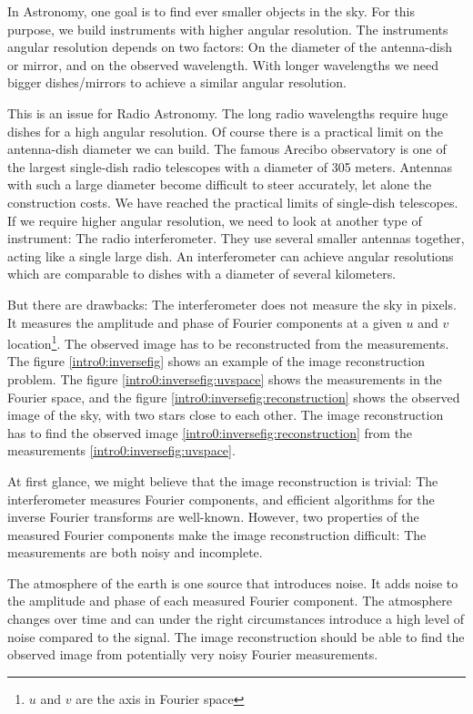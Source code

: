 In Astronomy, one goal is to find ever smaller objects in the sky. For this purpose, we build instruments with higher angular resolution. The instruments angular resolution depends on two factors: On the diameter of the antenna-dish or mirror, and on the observed wavelength. With longer wavelengths we need bigger dishes/mirrors to achieve a similar angular resolution. 

This is an issue for Radio Astronomy. The long radio wavelengths require huge dishes for a high angular resolution. Of course there is a practical limit on the antenna-dish diameter we can build. The famous Arecibo observatory is one of the largest single-dish radio telescopes with a diameter of 305 meters. Antennas with such a large diameter become difficult to steer accurately, let alone the construction costs. We have reached the practical limits of single-dish telescopes. If we require higher angular resolution, we need to look at another type of instrument: The radio interferometer. They use several smaller antennas together, acting like a single large dish. An interferometer can achieve angular resolutions which are comparable to dishes with a diameter of several kilometers.

But there are drawbacks: The interferometer does not measure the sky in pixels. It measures the amplitude and phase of Fourier components at a given $u$ and $v$ location\footnote{$u$ and $v$ are the axis in Fourier space}. The observed image has to be reconstructed from the measurements. The figure \ref{intro0:inversefig} shows an example of the image reconstruction problem. The figure \ref{intro0:inversefig:uvspace} shows the measurements in the Fourier space, and the figure \ref{intro0:inversefig:reconstruction} shows the observed image of the sky, with two stars close to each other. The image reconstruction has to find the observed image \ref{intro0:inversefig:reconstruction} from the measurements \ref{intro0:inversefig:uvspace}. 

At first glance, we might believe that the image reconstruction is trivial: The interferometer measures Fourier components, and efficient algorithms for the inverse Fourier transforms are well-known. However, two properties of the measured Fourier components make the image reconstruction difficult: The measurements are both noisy and incomplete.

The atmosphere of the earth is one source that introduces noise. It adds noise to the amplitude and phase of each measured Fourier component. The atmosphere changes over time and can under the right circumstances introduce a high level of noise compared to the signal. The image reconstruction should be able to find the observed image from potentially very noisy Fourier measurements.


